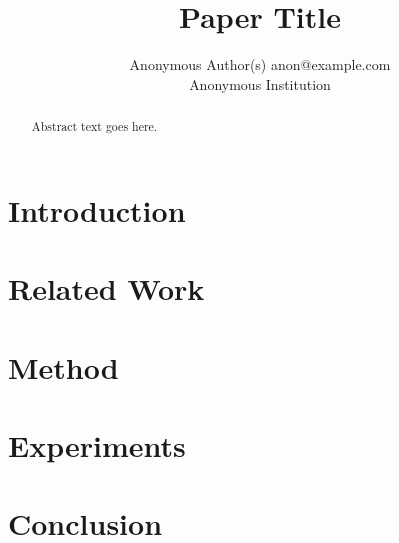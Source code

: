 \documentclass[10pt]{article}
\title{Paper Title}
\author{\name Anonymous Author(s) \email anon@example.com \\
        \addr Anonymous Institution}
\begin{document}
\maketitle

\begin{abstract}
Abstract text goes here.
\end{abstract}

\section{Introduction}

\section{Related Work}

\section{Method}

\section{Experiments}

\section{Conclusion}



\end{document}
